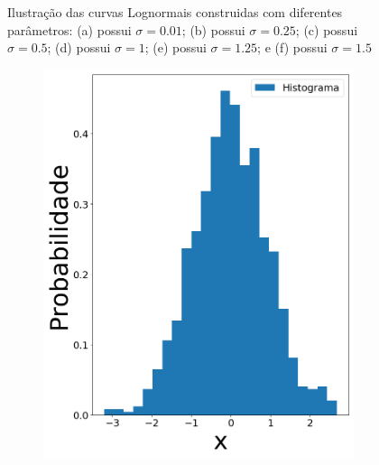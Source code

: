 \begin{figure}[H]
\begin{subfigure}[b]{0.3\textwidth}
		\caption{}
		\label{fig:sig150}
	\end{subfigure}
	
	\caption{Ilustração das curvas Lognormais construidas com diferentes parâmetros: (a) possui $\sigma = 0.01$; (b) possui $\sigma = 0.25$; (c) possui $\sigma = 0.5$; (d) possui $\sigma = 1$; (e) possui $\sigma = 1.25$; e (f) possui $\sigma = 1.5$}
	\label{fig:Lognormal}
\end{figure}



\begin{figure}[H]
\centering
\begin{subfigure}[b]{0.27\textwidth}
	\centering 
	\includegraphics[width=\linewidth]{./figuras/datanormal_0}
	\caption{}
	\label{fig:randn}
\end{subfigure}
\hfill
\begin{subfigure}[b]{0.27\textwidth}
	\centering 

\end{subfigure}
\end{figure}
